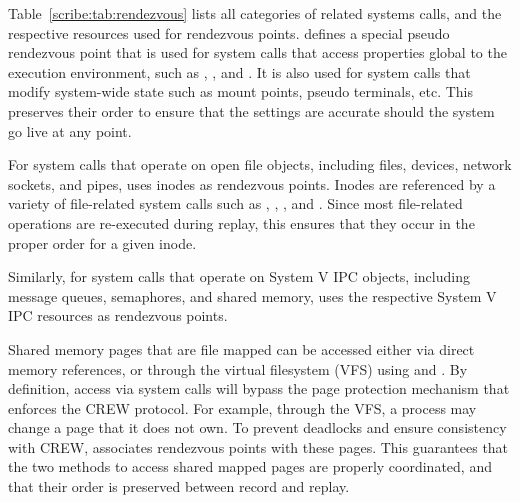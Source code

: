   

Table~\ref{scribe:tab:rendezvous} lists all categories of related systems
calls, and the respective resources used for rendezvous points.
\scribe{} defines a special pseudo rendezvous point that
is used for system calls that access properties global to the
execution environment, such as , , and
. It is also used for system calls that modify
system-wide state such as mount points, pseudo terminals, etc.  This
preserves their order to ensure that the settings are accurate should
the system go live at any point.

  

For system calls that operate on open file objects, including files,
devices, network sockets, and pipes, \scribe{} uses inodes as
rendezvous points.  Inodes are referenced by a variety of file-related
system calls such as , ,
,
and .  Since most
file-related operations are re-executed during replay, this ensures
that they occur in the proper order for a given inode.
 
Similarly, for system calls that operate on System V IPC
objects, including message queues, semaphores, and shared memory,
\scribe{} uses the respective System V IPC resources as rendezvous points.

Shared memory pages that are file mapped can be accessed either via
direct memory references, or through the virtual filesystem (VFS)
using  and . By definition, access via
system calls will bypass the page protection mechanism that enforces
the CREW protocol. For example, through the VFS, a process may change a
page that it does not own. To prevent deadlocks and ensure consistency
with CREW, \scribe{} associates rendezvous points with these pages.
This guarantees that the two methods to access shared mapped pages are
properly coordinated, and that their order is preserved between record
and replay.

